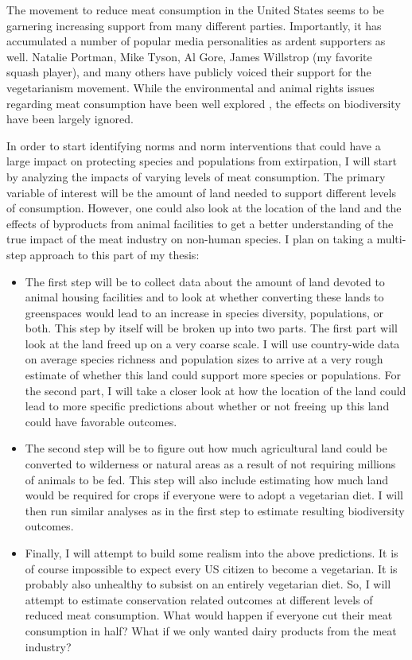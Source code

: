 \documentclass[rutwik_proposal.tex]{subfiles}
\begin{document}
The movement to reduce meat consumption in the United States seems to be garnering increasing support from many different parties. Importantly, it has accumulated a number of popular media personalities as ardent supporters as well. Natalie Portman, Mike Tyson, Al Gore, James Willstrop (my favorite squash player), and many others have publicly voiced their support for the vegetarianism movement. While the environmental and animal rights issues regarding meat consumption have been well explored \cite{Foer10, Silverstone09, Singer06}, the effects on biodiversity have been largely ignored.

In order to start identifying norms and norm interventions that could have a large impact on protecting species and populations from extirpation, I will start by analyzing the impacts of varying levels of meat consumption. The primary variable of interest will be the amount of land needed to support different levels of consumption. However, one could also look at the location of the land and the effects of byproducts from animal facilities to get a better understanding of the true impact of the meat industry on non-human species. I plan on taking a multi-step approach to this part of my thesis:

\begin{itemize}

\item The first step will be to collect data about the amount of land devoted to animal housing facilities and to look at whether converting these lands to greenspaces would lead to an increase in species diversity, populations, or both. This step by itself will be broken up into two parts. The first part will look at the land freed up on a very coarse scale. I will use country-wide data on average species richness and population sizes to arrive at a very rough estimate of whether this land could support more species or populations. For the second part, I will take a closer look at how the location of the land could lead to more specific predictions about whether or not freeing up this land could have favorable outcomes.

\item The second step will be to figure out how much agricultural land could be converted to wilderness or natural areas as a result of not requiring millions of animals to be fed. This step will also include estimating how much land would be required for crops if everyone were to adopt a vegetarian diet. I will then run similar analyses as in the first step to estimate resulting biodiversity outcomes.

\item Finally, I will attempt to build some realism into the above predictions. It is of course impossible to expect every US citizen to become a vegetarian. It is probably also unhealthy to subsist on an entirely vegetarian diet. So, I will attempt to estimate conservation related outcomes at different levels of reduced meat consumption. What would happen if everyone cut their meat consumption in half? What if we only wanted dairy products from the meat industry?

\end{itemize}
\end{document}
